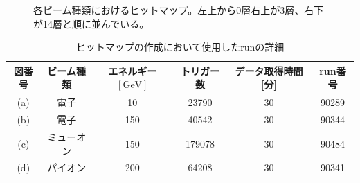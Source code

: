 \begin{figure}[H]
\begin{minipage}[b]{0.45\linewidth}
  \end{minipage}
  \caption[各ビーム種類におけるヒットマップ]{各ビーム種類におけるヒットマップ。左上から0層右上が3層、右下が14層と順に並んでいる。}
  \label{hitmap}
\end{figure}

\begin{table}[H]
\centering
\begin{tabular}{ c c c c c c}
\hline
図番号 & ビーム種類 & エネルギー$ [\mathrm{GeV}] $ & トリガー数 & データ取得時間 [分] & run番号 \\
\hline \hline
(a) & 電子 & 10 & 23790 & 30 & 90289 \\
(b) & 電子 & 150 & 40542 & 30 & 90344 \\
(c) & ミューオン & 150 & 179078 & 30 & 90484 \\
(d) & パイオン & 200 & 64208 & 30 & 90341 \\
\hline
\end{tabular}
\caption{ヒットマップの作成において使用したrunの詳細}
\end{table}

